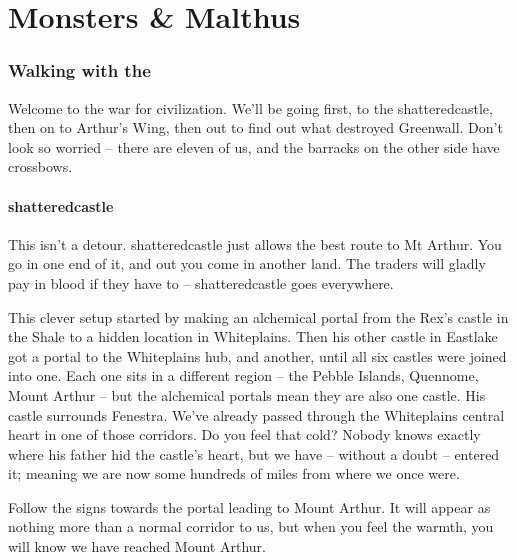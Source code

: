 \chapter{Monsters \& Malthus}

\begin{multicols}{2}

\subsection{Walking with the }

\begin{exampletext}

  Welcome to the war for civilization.
  We'll be going first, to the \gls{shatteredcastle}, then on to Arthur's Wing, then out to find out what destroyed Greenwall.
  Don't look so worried -- there are eleven of us, and the barracks on the other side have crossbows.

\end{exampletext}

\subsubsection{\Gls{shatteredcastle}}

\begin{exampletext}

  This isn't a detour.
  \Gls{shatteredcastle} just allows the best route to Mt Arthur.
  You go in one end of it, and out you come in another land.
  The traders will gladly pay in blood if they have to -- \gls{shatteredcastle} goes everywhere.

  This clever setup started by making an alchemical portal from the Rex's castle in the Shale to a hidden location in Whiteplains.
  Then his other castle in Eastlake got a portal to the Whiteplains hub, and another, until all six castles were joined into one.
  Each one sits in a different region -- the Pebble Islands, Quennome, Mount Arthur -- but the alchemical portals mean they are also one castle.
  His castle surrounds Fenestra.
  We've already passed through the Whiteplains central heart in one of those corridors.
  Do you feel that cold?
  Nobody knows exactly where his father hid the castle's heart, but we have -- without a doubt -- entered it; meaning we are now some hundreds of miles from where we once were.

  Follow the signs towards the portal leading to Mount Arthur.
  It will appear as nothing more than a normal corridor to us, but when you feel the warmth, you will know we have reached Mount Arthur.


\end{exampletext}
\end{multicols}
